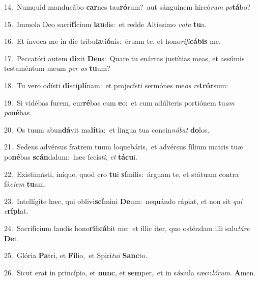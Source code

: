 {\numbfont\textcolor{\numbcolor}{14.}}~Numquid manducábo \textbf{car}\-nes tau\-\textbf{ró}\-rum?~\star aut sánguinem hircó\textit{rum} \textit{po}\-\textbf{tá}bo?\par
{\numbfont\textcolor{\numbcolor}{15.}}~Immola Deo sacri\-\textbf{fí}\-cium \textbf{lau}\-dis:~\star et redde Altíssimo \textit{vo}\-\textit{ta} \textbf{tu}\-a.\par
{\numbfont\textcolor{\numbcolor}{16.}}~Et ínvoca me in die tribu\-\textbf{la}\-ti\-\textbf{ó}\-nis:~\star éruam te, et hono\-\textit{ri}\-\textit{fi}\textbf{cá}\textbf{bis} me.\par
{\numbfont\textcolor{\numbcolor}{17.}}~Peccatóri autem \textbf{di}\-xit \textbf{De}\-us:~\star Quare tu enárras justítias meas, et assúmis testaméntum meum \textit{per} \textit{os} \textbf{tu}\-um?\par
{\numbfont\textcolor{\numbcolor}{18.}}~Tu vero odísti \textbf{di}\-sci\-\textbf{plí}\-nam:~\star et projecísti sermónes me\textit{os} \textit{re}\-\textbf{trór}sum:\par
{\numbfont\textcolor{\numbcolor}{19.}}~Si vidébas furem, cur\-\textbf{ré}\-bas cum \textbf{e}\-o:~\star et cum adúlteris portiónem tu\textit{am} \textit{po}\-\textbf{né}bas.\par
{\numbfont\textcolor{\numbcolor}{20.}}~Os tuum abun\-\textbf{dá}\-vit ma\-\textbf{lí}\-tia:~\star et lingua tua concin\-\textit{ná}\-\textit{bat} \textbf{do}\-los.\par
{\numbfont\textcolor{\numbcolor}{21.}}~Sedens advérsus fratrem tuum loquebáris,~\dagger et advérsus fílium matris tuæ po\-\textbf{né}\-bas \textbf{scán}\-dalum:~\star hæc fecís\-\textit{ti}\-, \textit{et} \textbf{tá}\-\textbf{cu}i.\par
{\numbfont\textcolor{\numbcolor}{22.}}~Existimásti, iníque, quod ero \textbf{tu}\-i \textbf{sí}\-milis:~\star árguam te, et státuam contra fá\-\textit{ci}\-\textit{em} \textbf{tu}\-am.\par
{\numbfont\textcolor{\numbcolor}{23.}}~Intellígite hæc, qui oblivi\-\textbf{scí}\-mini \textbf{De}\-um:~\star nequándo rápiat, et non sit \textit{qui} \textit{e}\-\textbf{rí}\textbf{pi}at.\par
{\numbfont\textcolor{\numbcolor}{24.}}~Sacrifícium laudis hono\-\textbf{ri}\-fi\-\textbf{cá}\-bit me:~\star et illic iter, quo osténdam illi salu\-\textit{tá}\-\textit{re} \textbf{De}\-i.\par
{\numbfont\textcolor{\numbcolor}{25.}}~Glória \textbf{Pa}\-tri, et \textbf{Fí}\-lio,~\star et Spirí\-\textit{tu}\-\textit{i} \textbf{Sanc}\-to.\par
{\numbfont\textcolor{\numbcolor}{26.}}~Sicut erat in princípio, et \textbf{nunc}\-, et \textbf{sem}\-per,~\star et in sǽcula sæcu\-\textit{ló}\-\textit{rum}. \textbf{A}\-men.\par
